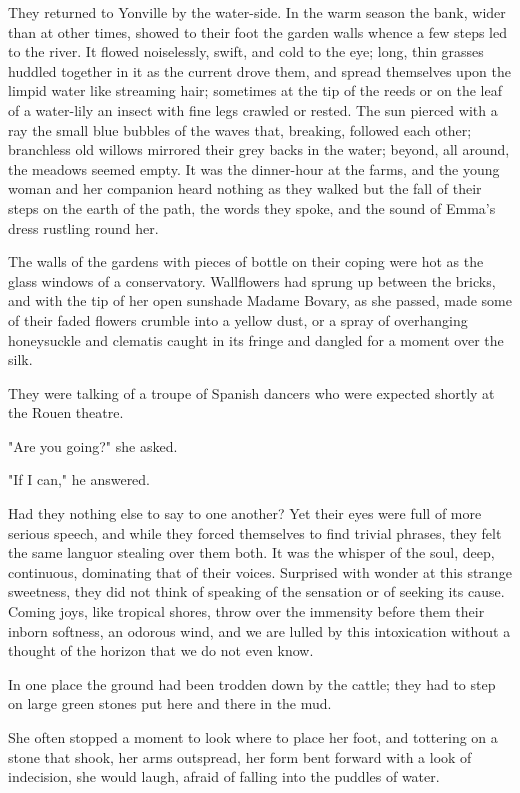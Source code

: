 \documentclass{tufte-book}
\begin{document}
They returned to Yonville by the water-side. In the warm season the
bank, wider than at other times, showed to their foot the garden walls
whence a few steps led to the river. It flowed noiselessly, swift,
and cold to the eye; long, thin grasses huddled together in it as the
current drove them, and spread themselves upon the limpid water like
streaming hair; sometimes at the tip of the reeds or on the leaf of a
water-lily an insect with fine legs crawled or rested. The sun pierced
with a ray the small blue bubbles of the waves that, breaking, followed
each other; branchless old willows mirrored their grey backs in
the water; beyond, all around, the meadows seemed empty. It was the
dinner-hour at the farms, and the young woman and her companion heard
nothing as they walked but the fall of their steps on the earth of the
path, the words they spoke, and the sound of Emma's dress rustling round
her.

The walls of the gardens with pieces of bottle on their coping were
hot as the glass windows of a conservatory. Wallflowers had sprung up
between the bricks, and with the tip of her open sunshade Madame Bovary,
as she passed, made some of their faded flowers crumble into a yellow
dust, or a spray of overhanging honeysuckle and clematis caught in its
fringe and dangled for a moment over the silk.

They were talking of a troupe of Spanish dancers who were expected
shortly at the Rouen theatre.

"Are you going?" she asked.

"If I can," he answered.

Had they nothing else to say to one another? Yet their eyes were full
of more serious speech, and while they forced themselves to find trivial
phrases, they felt the same languor stealing over them both. It was the
whisper of the soul, deep, continuous, dominating that of their voices.
Surprised with wonder at this strange sweetness, they did not think of
speaking of the sensation or of seeking its cause. Coming joys, like
tropical shores, throw over the immensity before them their inborn
softness, an odorous wind, and we are lulled by this intoxication
without a thought of the horizon that we do not even know.

In one place the ground had been trodden down by the cattle; they had to
step on large green stones put here and there in the mud.

She often stopped a moment to look where to place her foot, and
tottering on a stone that shook, her arms outspread, her form bent
forward with a look of indecision, she would laugh, afraid of falling
into the puddles of water.
\end{document}
